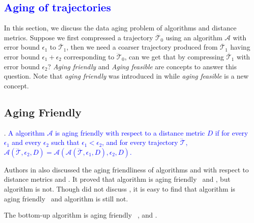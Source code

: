 
\textcolor{blue}{\section{Aging of trajectories}}

In this section, we discuss the data aging problem of \lsa algorithms and distance metrics.
%
Suppose we first compressed a trajectory $\dddot{\mathcal{T}_0}$ using an \lsa algorithm $\mathcal{A}$ with error bound $\epsilon_1$ to $\overline{\mathcal{T}}_1$, then we need a coarser trajectory produced from $\overline{\mathcal{T}}_1$  having error bound $\epsilon_1 + \epsilon_2$ corresponding to $\dddot{\mathcal{T}}_0$, can we get that by compressing $\overline{\mathcal{T}}_1$ with error bound $\epsilon_2$?  \emph{Aging friendly \cite{Cao:Spatio}} and \emph{Aging feasible} are concepts to answer this question. Note that \emph{aging friendly} was introduced in \cite{Cao:Spatio} while \emph{aging feasible} is a new concept.

\subsection{Aging Friendly}
	
. \textcolor{blue}{A \lsa algorithm $\mathcal{A}$ is aging friendly with respect to a distance metric $D$ if for every $\epsilon_1$ and every $\epsilon_2$ such that $\epsilon_1 < \epsilon_2$, and for every trajectory $\dddot{\mathcal{T}}$, $\mathcal{A}(\dddot{\mathcal{T}}, \epsilon_2, D)= \mathcal{A}(\mathcal{A}(\dddot{\mathcal{T}}, \epsilon_1, D), \epsilon_2, D)$.}

	
Authors in \cite{Cao:Spatio} also discussed the aging friendliness of algorithms \opt and \dpa with respect to distance metrics \ped and \sed. It proved that algorithm \dpa is aging friendly \wrt~\ped and \sed, but algorithm \opt is not. 
Though \cite{Cao:Spatio} did not discuss \dad, it is easy to find that algorithm \dpa is aging friendly \wrt~\dad and algorithm \opt is still not.



\begin{theorem}
\label{theo-aging-tp}
The bottom-up algorithm \tpa is aging friendly \wrt~\ped, \sed and \dad.
\end{theorem}

